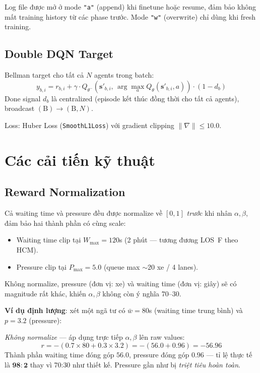 \documentclass[conference]{IEEEtran}
\begin{document}
Log file được mở ở mode \texttt{"a"} (append) khi finetune hoặc resume, đảm bảo không mất training history từ các phase trước. Mode \texttt{"w"} (overwrite) chỉ dùng khi fresh training.

\subsection{Double DQN Target}

Bellman target cho tất cả $N$ agents trong batch:
\begin{equation}
    y_{b,i} = r_{b,i} + \gamma \cdot Q_{\theta^{-}}\!\left(\mathbf{s}'_{b,i},\, \arg\max_a Q_\theta(\mathbf{s}'_{b,i}, a)\right) \cdot (1 - d_b)
    \label{eq:target}
\end{equation}
Done signal $d_b$ là centralized (episode kết thúc đồng thời cho tất cả agents), broadcast $(\text{B}) \to (\text{B}, N)$.

Loss: Huber Loss (\texttt{SmoothL1Loss}) với gradient clipping $\|\nabla\| \leq 10.0$.

\section{Các cải tiến kỹ thuật}

\subsection{Reward Normalization}

Cả waiting time và pressure đều được normalize về $[0, 1]$ \textit{trước} khi nhân $\alpha, \beta$, đảm bảo hai thành phần có cùng scale:
\begin{itemize}[leftmargin=*]
    \item Waiting time clip tại $W_{\max} = 120$s (2 phút --- tương đương LOS~F theo HCM).
    \item Pressure clip tại $P_{\max} = 5.0$ (queue max $\sim$20 xe / 4 lanes).
\end{itemize}
Không normalize, pressure (đơn vị: xe) và waiting time (đơn vị: giây) sẽ có magnitude rất khác, khiến $\alpha, \beta$ không còn ý nghĩa 70--30.

\textbf{Ví dụ định lượng}: xét một ngã tư có $\bar{w} = 80$s (waiting time trung bình) và $p = 3.2$ (pressure):

\textit{Không normalize} --- áp dụng trực tiếp $\alpha, \beta$ lên raw values:
\begin{equation*}
    r = -\left(0.7 \times 80 + 0.3 \times 3.2\right) = -(56.0 + 0.96) = -56.96
\end{equation*}
Thành phần waiting time đóng góp $56.0$, pressure đóng góp $0.96$ --- tỉ lệ thực tế là $\mathbf{98{:}2}$ thay vì 70{:}30 như thiết kế. Pressure gần như bị \textit{triệt tiêu hoàn toàn}.
\end{document}
